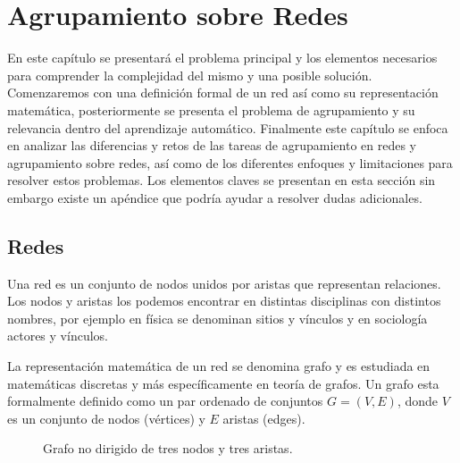 
\chapter{Agrupamiento sobre Redes} %



En este capítulo se presentará el problema principal y los elementos necesarios para comprender la complejidad del mismo y una posible solución. Comenzaremos con una definición formal de un red así como su representación matemática, posteriormente se presenta el problema de agrupamiento y su relevancia dentro del aprendizaje automático. Finalmente este capítulo se enfoca en analizar las diferencias y retos de las tareas de agrupamiento en redes y agrupamiento sobre redes, así como de los diferentes enfoques y limitaciones para resolver estos problemas. Los elementos claves se presentan en esta sección sin embargo existe un apéndice que podría ayudar a resolver dudas adicionales.

\section{Redes}

Una red es un conjunto de nodos unidos por aristas que representan relaciones. Los nodos y aristas los podemos encontrar en distintas disciplinas con distintos nombres, por ejemplo en física se denominan sitios y vínculos y en sociología actores y vínculos. 

La representación matemática de un red se denomina grafo y es estudiada en matemáticas discretas y más específicamente en teoría de grafos. Un grafo esta formalmente definido como un par ordenado de conjuntos $G = (V,E)$, donde $V$ es un conjunto de nodos (vértices) y $E$ aristas (edges). \cite{saoub_graph_2021}

 \begin{figure}[htbp]
   \centering
   
    \caption{Grafo no dirigido de tres nodos y tres aristas.}
    \label{fig:graph}
\end{figure}

